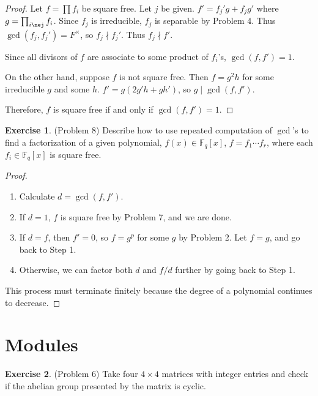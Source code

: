 \documentclass[12pt, psamsfonts]{amsart}
\theoremstyle{definition}
\newtheorem*{exer}{Exercise}
\theoremstyle{remark}
\numberwithin{equation}{section}
\begin{document}
\begin{proof}
  Let $f = \prod f_i$ be square free.
  Let $j$ be given.
  $f' = f_j'g + f_jg'$ where $g = \prod_{i\nej} f_i$.
  Since $f_j$ is irreducible, $f_j$ is separable by Problem 4.
  Thus $\gcd(f_j, f_j') = F^{\times}$, so $f_j \nmid f_j'$.
  Thus $f_j \nmid f'$.

  Since all divisors of $f$ are associate to some product of $f_i$'s, $\gcd(f, f') = 1$.

  On the other hand, suppose $f$ is not square free.
  Then $f = g^2h$ for some irreducible $g$ and some $h$.
  $f' = g(2g'h + gh')$, so $g \mid \gcd(f, f')$.

  Therefore, $f$ is square free if and only if $\gcd(f, f') = 1$.
\end{proof}

\begin{exer}{(Problem 8)}
  Describe how to use repeated computation of $\gcd$'s to find a factorization of a given polynomial, $f(x) \in \mathbb{F}_q[x]$, $f = f_1 \cdots f_r$, where each $f_i \in \mathbb{F}_q[x]$ is square free.
\end{exer}

\begin{proof}
  $ $
  \begin{enumerate}
    \item 
      Calculate $d = \gcd(f, f')$.
    \item
      If $d = 1$, $f$ is square free by Problem 7, and we are done.
    \item
      If $d = f$, then $f' = 0$, so $f = g^p$ for some $g$ by Problem 2.
      Let $f = g$, and go back to Step 1.
    \item
      Otherwise, we can factor both $d$ and $f / d$ further by going back to Step 1.
  \end{enumerate}
  This process must terminate finitely because the degree of a polynomial continues to decrease.
\end{proof}

\section{Modules}

\begin{exer}{(Problem 6)}
  Take four $4 \times 4$ matrices with integer entries and check if the abelian group presented by the matrix is cyclic.
\end{exer}
\end{document}
